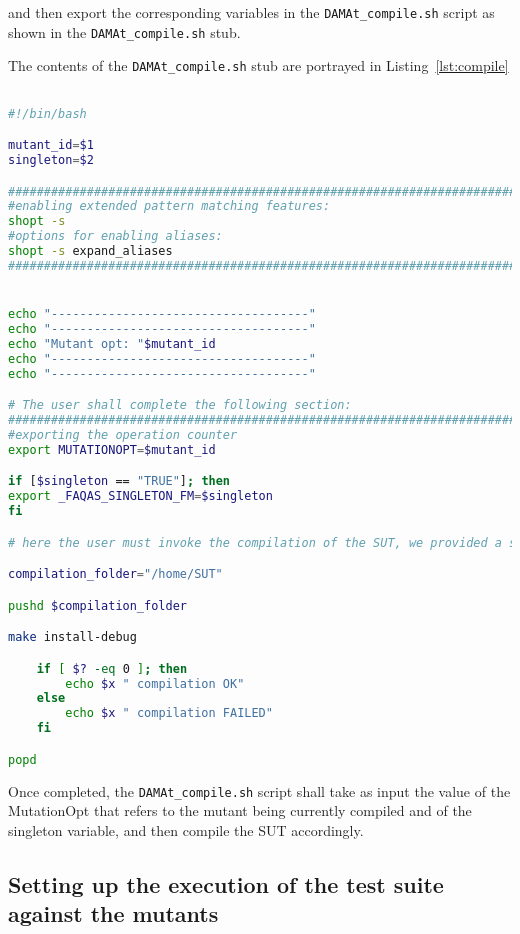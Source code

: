 and then export the corresponding variables in the \texttt{DAMAt\_compile.sh} script as shown in the \texttt{DAMAt\_compile.sh} stub.

The contents of the \texttt{DAMAt\_compile.sh} stub are portrayed in Listing~\ref{lst:compile}

\begin{lstlisting}[label={lst:compile},language=bash]

#!/bin/bash

mutant_id=$1
singleton=$2

###############################################################################
#enabling extended pattern matching features:
shopt -s
#options for enabling aliases:
shopt -s expand_aliases
###############################################################################


echo "------------------------------------"
echo "------------------------------------"
echo "Mutant opt: "$mutant_id
echo "------------------------------------"
echo "------------------------------------"

# The user shall complete the following section:
###############################################################################
#exporting the operation counter
export MUTATIONOPT=$mutant_id

if [$singleton == "TRUE"]; then
export _FAQAS_SINGLETON_FM=$singleton
fi

# here the user must invoke the compilation of the SUT, we provided a simple example.

compilation_folder="/home/SUT"

pushd $compilation_folder

make install-debug

    if [ $? -eq 0 ]; then
        echo $x " compilation OK"
    else
        echo $x " compilation FAILED"
    fi

popd


\end{lstlisting}

Once completed, the \texttt{DAMAt\_compile.sh} script shall take as input the value of the MutationOpt that refers to the mutant being currently compiled and of the singleton variable, and then compile the SUT accordingly.

\subsection{Setting up the execution of the test suite against the mutants}

